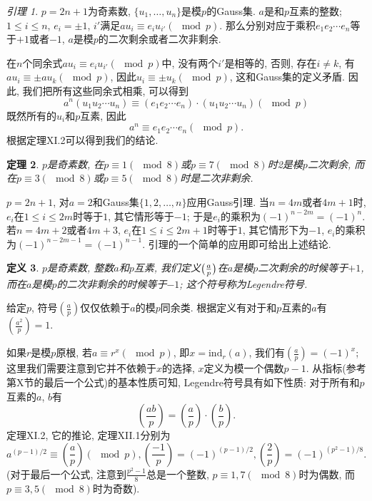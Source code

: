 \documentclass[12pt,a4paper]{book} %
\newtheorem{theorem}{定理}
\newtheorem{definition}[theorem]{定义}
\theoremstyle{remark}
\theoremstyle{example}
\theoremstyle{lemma}
\newtheorem{lemma}[theorem]{引理}
\theoremstyle{corollary}
\numberwithin{theorem}{chapter}
\begin{document}
\begin{lemma}
$p = 2n + 1$为奇素数, $\{u_1, \ldots, u_n\}$是模$p$的Gauss集. $a$是和$p$互素的整数; $1 \le i \le n$, $e_i = \pm 1$, $i'$满足$au_i \equiv e_i u_{i'} (\mod p)$. 那么分别对应于乘积$e_1e_2 \cdots e_n$等于$+1$或者$-1$, $a$是模$p$的二次剩余或者二次非剩余.
\end{lemma}

在$n$个同余式$au_i \equiv e_i u_{i'} (\mod p)$中, 没有两个$i'$是相等的, 否则, 存在$i \neq k$, 有$au_i \equiv \pm au_k (\mod p)$, 因此$u_i \equiv \pm u_k (\mod p)$, 这和Gauss集的定义矛盾. 因此, 我们把所有这些同余式相乘, 可以得到
\[
a^n(u_1 u_2 \cdots u_n) \equiv (e_1 e_2 \cdots e_n) \cdot (u_1 u_2 \cdots u_n) (\mod p)
\]
既然所有的$u_i$和$p$互素, 因此
\[
a^n \equiv e_1 e_2 \cdots e_n (\mod p).
\]
根据定理XI.2可以得到我们的结论.

\begin{theorem}
$p$是奇素数, 在$p \equiv 1 (\mod 8)$或$p \equiv 7 (\mod 8)$时2是模$p$二次剩余, 而在$p \equiv 3 (\mod 8)$或$p \equiv 5 (\mod 8)$时是二次非剩余.
\end{theorem}

$p = 2n + 1$, 对$a = 2$和Gauss集$\{1, 2, \ldots, n\}$应用Gauss引理. 当$n = 4m$或者$4m + 1$时, $e_i$在$1 \le i \le 2m$时等于$1$, 其它情形等于$-1$; 于是$e_i$的乘积为$(-1)^{n - 2m} = (-1)^n$. 若$n = 4m + 2$或者$4m + 3$, $e_i$在$1 \le i \le 2m + 1$时等于$1$, 其它情形下为$-1$, $e_i$的乘积为$(-1)^{n - 2m - 1} = (-1)^{n - 1}$. 引理的一个简单的应用即可给出上述结论.

\begin{definition}
$p$是奇素数, 整数$a$和$p$互素, 我们定义$\big{(}\frac{a}{p}\big{)}$在$a$是模$p$二次剩余的时候等于$+ 1$, 而在$a$是模$p$的二次非剩余的时候等于$-1$; 这个符号称为Legendre符号.
\end{definition}

给定$p$, 符号$(\frac{a}{p})$仅仅依赖于$a$的模$p$同余类. 根据定义有对于和$p$互素的$a$有$(\frac{a^2}{p}) = 1$. 

如果$r$是模$p$原根, 若$a \equiv r^x (\mod p)$, 即$x = \text{ind}_r(a)$, 我们有$(\frac{a}{p}) = (-1)^x$; 这里我们需要注意到它并不依赖于$x$的选择, $x$定义为模一个偶数$p - 1$. 从指标(参考第X节的最后一个公式)的基本性质可知, Legendre符号具有如下性质: 对于所有和$p$互素的$a$, $b$有
\[
(\frac{ab}{p}) = (\frac{a}{p}) \cdot (\frac{b}{p}).
\]
定理XI.2, 它的推论, 定理XII.1分别为
\[
a^{(p-1)/2} \equiv (\frac{a}{p}) (\mod p), (\frac{-1}{p}) = (-1)^{(p - 1) / 2}, (\frac{2}{p}) = (-1)^{(p^2 - 1) / 8}.
\]
(对于最后一个公式, 注意到$\frac{p^2 - 1}{8}$总是一个整数, $p \equiv 1, 7 (\mod 8)$时为偶数, 而$p \equiv 3, 5 (\mod 8)$时为奇数).
\end{document}
